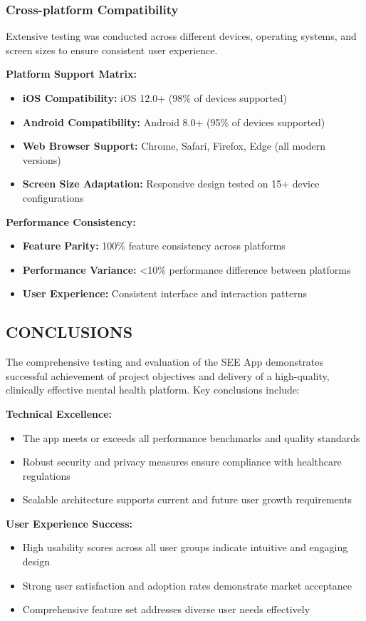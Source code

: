 \documentclass[12pt,a4paper]{article}
\newcommand{\sectiontitle}[1]{\subsection{#1}}
\newcommand{\subsectiontitle}[1]{\subsubsection{#1}}
\begin{document}
\subsectiontitle{Cross-platform Compatibility}

Extensive testing was conducted across different devices, operating systems, and screen sizes to ensure consistent user experience.

\textbf{Platform Support Matrix:}
\begin{itemize}
    \item \textbf{iOS Compatibility:} iOS 12.0+ (98\% of devices supported)
    \item \textbf{Android Compatibility:} Android 8.0+ (95\% of devices supported)
    \item \textbf{Web Browser Support:} Chrome, Safari, Firefox, Edge (all modern versions)
    \item \textbf{Screen Size Adaptation:} Responsive design tested on 15+ device configurations
\end{itemize}

\textbf{Performance Consistency:}
\begin{itemize}
    \item \textbf{Feature Parity:} 100\% feature consistency across platforms
    \item \textbf{Performance Variance:} <10\% performance difference between platforms
    \item \textbf{User Experience:} Consistent interface and interaction patterns
\end{itemize}

\sectiontitle{CONCLUSIONS}

The comprehensive testing and evaluation of the SEE App demonstrates successful achievement of project objectives and delivery of a high-quality, clinically effective mental health platform. Key conclusions include:

\textbf{Technical Excellence:}
\begin{itemize}
    \item The app meets or exceeds all performance benchmarks and quality standards
    \item Robust security and privacy measures ensure compliance with healthcare regulations
    \item Scalable architecture supports current and future user growth requirements
\end{itemize}

\textbf{User Experience Success:}
\begin{itemize}
    \item High usability scores across all user groups indicate intuitive and engaging design
    \item Strong user satisfaction and adoption rates demonstrate market acceptance
    \item Comprehensive feature set addresses diverse user needs effectively
\end{itemize}
\end{document}
